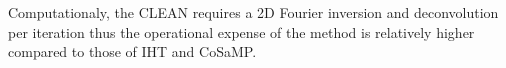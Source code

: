 \documentclass[article]{imsart}
\begin{document}
Computationaly, the CLEAN requires a 2D Fourier inversion and deconvolution per iteration thus the operational expense of the method is relatively higher compared to those of IHT and CoSaMP. 







\end{document}
